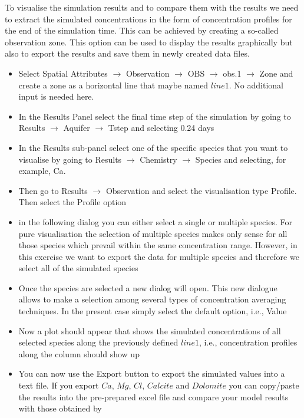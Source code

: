 To visualise the simulation results and to compare them with the results 
we need to extract the simulated concentrations in the form of concentration profiles 
for the end of the simulation time. This can be achieved by creating a so-called observation zone. 
This option can be used to display the results graphically but also to export the results and save them in newly created data files.  

\begin{itemize}

\item Select {\color{blue}Spatial Attributes} $\rightarrow$ {\color{blue}Observation} $\rightarrow$ {\color{blue}OBS} $\rightarrow$ {\color{blue}obs.1} $\rightarrow$ {\color{blue}Zone}
and create a zone as a horizontal line that maybe named $line1$. 
No additional input is needed here.

\item In the {\color{blue}Results Panel} select the final time step of the simulation
by going to {\color{blue}Results} $\rightarrow$ {\color{blue}Aquifer} 
$\rightarrow$ {\color{blue}Tstep} and selecting {\color{blue}0.24} days

\item In the {\color{blue}Results} sub-panel select one of the specific species that you want to visualise
by going to {\color{blue}Results} $\rightarrow$ {\color{blue}Chemistry} 
$\rightarrow$ {\color{blue}Species} and selecting, for example, {\color{blue}Ca}. 

\item Then go to {\color{blue}Results} $\rightarrow$ {\color{blue}Observation} and select the 
visualisation type {\color{blue}Profile}. Then select the {\color{blue}Profile} option

\item in the following dialog you can either select a single or multiple species. 
For pure visualisation the selection of multiple species makes only sense for all those 
species which prevail within the same concentration range. 
However, in this exercise we want to export the data for multiple species and 
therefore we select all of the simulated species 

\item Once the species are selected a new dialog will open. This new dialogue allows to make a selection among several types of concentration averaging techniques. 
In the present case simply select the default option, i.e., {\color{blue}Value}

\item Now a plot should appear that shows the simulated concentrations of all selected species 
along the previously defined $line1$, i.e., concentration profiles along the column should show up

\item You can now use the {\color{blue}Export} button to export the simulated values into a text file.
If you export $Ca$, $Mg$, $Cl$, $Calcite$ and $Dolomite$ you can copy/paste the results into the pre-prepared excel file and compare your model results with those obtained by \cite{enges92}

\end{itemize}

